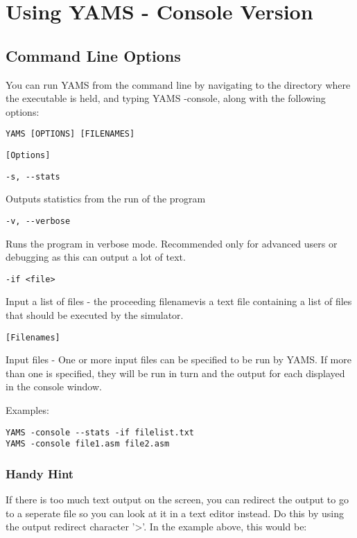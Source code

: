 \documentclass[12pt]{report}
\begin{document}
\section{Using YAMS - Console Version}
\subsection{Command Line Options}
You can run YAMS from the command line by navigating to the directory where the executable is held, and typing  YAMS -console, along with the following options:

\begin{verbatim}
YAMS [OPTIONS] [FILENAMES]
\end{verbatim}

\begin{verbatim}
[Options]
\end{verbatim}

\begin{verbatim}
-s, --stats
\end{verbatim}
Outputs statistics from the run of the program

\begin{verbatim}
-v, --verbose
\end{verbatim}Runs the program in verbose mode. Recommended only for advanced users or debugging as this can output a lot of text.

\begin{verbatim}
-if <file>	
\end{verbatim}Input a list of files - the proceeding filenamevis a text file containing a list of files that should be executed by the simulator.

\begin{verbatim}
[Filenames]
\end{verbatim}Input files - One or more input files can be specified to be run by YAMS. If more than one is specified, they will be run in turn and the output for each displayed in the console window.



Examples:
\begin{verbatim}
YAMS -console --stats -if filelist.txt
YAMS -console file1.asm file2.asm
\end{verbatim}

\subsubsection{Handy Hint}
If there is too much text output on the screen, you can redirect the output to go to a seperate file so you can look at it in a text editor instead. Do this by using the output redirect character '>'.  In the example above, this would be:
\end{document}
